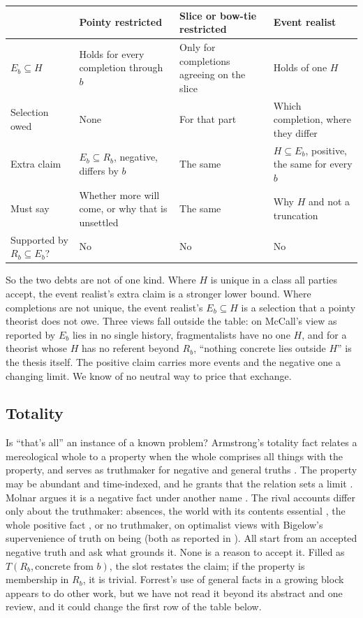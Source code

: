 \documentclass[11pt]{article}
\theoremstyle{definition}
\begin{document}
\begin{center}
\begin{tabularx}{\textwidth}{@{}lYYY@{}}
\toprule
 & Pointy restricted & Slice or bow-tie restricted & Event realist\\
\midrule
$E_b\subseteq H$ & Holds for every completion through $b$ & Only for completions agreeing on the slice & Holds of one $H$\\
Selection owed & None & For that part & Which completion, where they differ\\
Extra claim & $E_b\subseteq R_b$, negative, differs by $b$ & The same & $H\subseteq E_b$, positive, the same for every $b$\\
Must say & Whether more will come, or why that is unsettled & The same & Why $H$ and not a truncation\\
Supported by $R_b\subseteq E_b$? & No & No & No\\
\bottomrule
\end{tabularx}
\end{center}

So the two debts are not of one kind. Where $H$ is unique in a class all parties accept, the event realist's extra
claim is a stronger lower bound. Where completions are not unique, the event realist's $E_b\subseteq H$ is a selection
that a pointy theorist does not owe. Three views fall outside the table: on McCall's view as reported by \citet{Earman2008} $E_b$ lies
in no single history, fragmentalists have no one $H$, and for a theorist whose $H$ has no referent beyond $R_b$,
``nothing concrete lies outside $H$'' is the thesis itself. The positive claim carries more events and the negative
one a changing limit. We know of no neutral way to price that exchange.

\subsection{Totality}

Is ``that's all'' an instance of a known problem? Armstrong's totality fact relates a mereological whole to a property when the whole comprises all things with the property, and serves as truthmaker for negative and general truths \citep[\S6.2]{Armstrong2004}. The property may be abundant and time-indexed, and he grants that the relation sets a limit \citep[pp.~72--73]{Armstrong2004}. Molnar argues it is a negative fact under another
name \citep{Molnar2000}. The rival accounts differ only about the truthmaker: absences, the world with its contents
essential \citep{Cameron2008}, the whole positive fact \citep{CheynePigden2006}, or no truthmaker, on optimalist views with Bigelow's supervenience of truth on being (both as reported in \citealp{MacBride2024}). All start from an accepted negative truth and ask what grounds it. None
is a reason to accept it. Filled as $T(R_b,\text{concrete from }b)$, the slot restates the claim; if the property is
membership in $R_b$, it is trivial. Forrest's use of general facts in a growing block \citep{Forrest2006} appears to do other work, but we have not read it beyond its abstract and one review, and it could change the first row of the table below.
\end{document}
